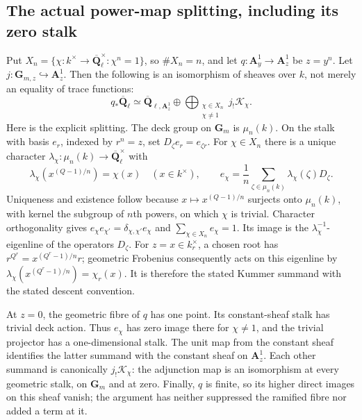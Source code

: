 \subsection{The actual power-map splitting, including its zero stalk}

Put \(X_n=\{\chi:k^\times\to\overline{\mathbf Q}_\ell^\times:
\chi^n=1\}\), so \(\#X_n=n\), and let
\(q:\mathbf A^1_y\to\mathbf A^1_z\) be \(z=y^n\).
Let \(j:\mathbf G_{m,z}\hookrightarrow\mathbf A^1_z\).
Then the following is an isomorphism of sheaves over \(k\), not
merely an equality of trace functions:
\[
 q_*\overline{\mathbf Q}_\ell
   \simeq \overline{\mathbf Q}_{\ell,\mathbf A^1_z}
     \oplus
     \bigoplus_{\substack{\chi\in X_n\\\chi\ne1}}
          j_!\mathcal K_\chi.
 \tag{SPF.9}\label{eq:SPF9}
\]
Here is the explicit splitting. The deck group on \(\mathbf G_m\)
is \(\mu_n(k)\). On the stalk with basis \(e_r\), indexed by
\(r^n=z\), set \(D_\zeta e_r=e_{\zeta r}\). For \(\chi\in X_n\)
there is a unique character \(\lambda_\chi:\mu_n(k)\to
\overline{\mathbf Q}_\ell^\times\) with
\[
 \lambda_\chi(x^{(Q-1)/n})=\chi(x)\quad(x\in k^\times),\qquad
 e_\chi=\frac1n\sum_{\zeta\in\mu_n(k)}
                   \lambda_\chi(\zeta)D_\zeta.
 \tag{SPF.10}\label{eq:SPF10}
\]
Uniqueness and existence follow because
\(x\mapsto x^{(Q-1)/n}\) surjects onto \(\mu_n(k)\), with kernel
the subgroup of \(n\)th powers, on which \(\chi\) is trivial.
Character orthogonality gives
\(e_\chi e_{\chi'}=\delta_{\chi,\chi'}e_\chi\) and
\(\sum_{\chi\in X_n}e_\chi=1\). Its image is the
\(\lambda_\chi^{-1}\)-eigenline of the operators \(D_\zeta\).
For \(z=x\in k_r^\times\), a chosen root has
\(r^{Q^r}=x^{(Q^r-1)/n}r\); geometric Frobenius consequently acts
on this eigenline by
\(\lambda_\chi(x^{(Q^r-1)/n})=\chi_r(x)\).
It is therefore the stated Kummer summand with the stated descent
convention.

At \(z=0\), the geometric fibre of \(q\) has one point. Its
constant-sheaf stalk has trivial deck action. Thus \(e_\chi\)
has zero image there for \(\chi\ne1\), and the trivial projector
has a one-dimensional stalk. The unit map from the constant sheaf
identifies the latter summand with the constant sheaf on
\(\mathbf A^1_z\). Each other summand is canonically \(j_!\mathcal
K_\chi\): the adjunction map is an isomorphism at every geometric
stalk, on \(\mathbf G_m\) and at zero. Finally, \(q\) is finite,
so its higher direct images on this sheaf vanish; the argument
has neither suppressed the ramified fibre nor added a term at it.

